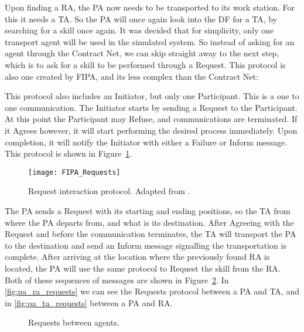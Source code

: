 Upon finding a \acrlong{RA}, the \acrlong{PA} now needs to be transported to its work station. For this it needs a \acrlong{TA}. So the \acrshort{PA} will once again look into the \acrshort{DF} for a \acrshort{TA}, by searching for a skill once again. It was decided that for simplicity, only one transport agent will be used in the simulated system. So instead of asking for an agent through the Contract Net, we can skip straight away to the next step, which is to ask for a skill to be performed through a Request. This protocol is also one created by \acrshort{FIPA}, and its less complex than the Contract Net:

This protocol also includes an Initiator, but only one Participant. This is a one to one communication. The Initiator starts by sending a Request to the Participant. At this point the Participant may Refuse, and communications are terminated. If it Agrees however, it will start performing the desired process immediately. Upon completion, it will notify the Initiator with either a Failure or Inform message. This protocol is shown in Figure~\ref{fig:requests_protocol}.\\

\begin{figure}[h!]
	\centering
	\texttt{[image: FIPA\_Requests]}
	\caption{Request interaction protocol. Adapted from \cite{FIPA_Request}.}
	\label{fig:requests_protocol}
\end{figure}

The \acrshort{PA} sends a Request with its starting and ending positions, so the \acrshort{TA} from where the \acrshort{PA} departs from, and what is its destination. After Agreeing with the Request and before the communication terminates, the \acrshort{TA} will transport the \acrshort{PA} to the destination and send an Inform message signalling the transportation is complete. After arriving at the location where the previously found \acrshort{RA} is located, the \acrshort{PA} will  use the same protocol to Request the skill from the \acrshort{RA}. Both of these sequences of messages are shown in Figure~\ref{fig:agent_requests}. In \ref{fig:pa_ra_requests} we can see the Requests protocol between a \acrshort{PA} and \acrshort{TA}, and in \ref{fig:pa_ta_requests} between a \acrshort{PA} and \acrshort{RA}.\\

\begin{figure}[h!]
	\centering
	\hspace{0.75cm}
	\caption{Requests between agents.}
	\label{fig:agent_requests}
\end{figure}

